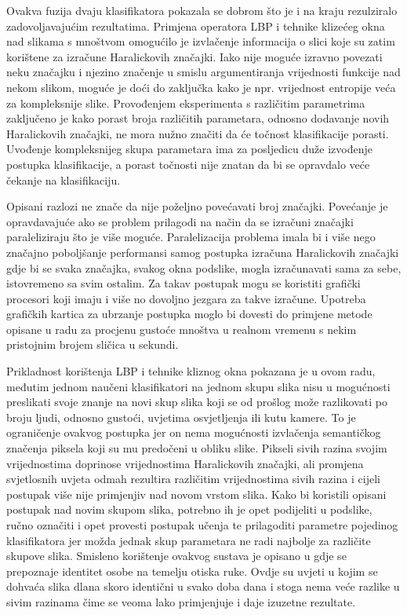 \documentclass[times, utf8, zavrsni, numeric]{fer}
\begin{document}
\bigbreak

Ovakva fuzija dvaju klasifikatora pokazala se dobrom što je i na kraju rezulziralo zadovoljavajućim
rezultatima. Primjena operatora LBP i tehnike klizećeg okna nad slikama s mnoštvom omogućilo je 
izvlačenje informacija o slici koje su zatim korištene za izračune Haralickovih značajki. Iako nije moguće 
izravno povezati neku značajku i njezino značenje u smislu argumentiranja vrijednosti funkcije
nad nekom slikom, moguće je doći do zaključka kako je npr. vrijednost entropije veća za kompleksnije slike.
Provođenjem eksperimenta s različitim parametrima zaključeno je kako porast broja različitih 
parametara, odnosno dodavanje novih Haralickovih značajki, ne mora nužno značiti da će točnost
klasifikacije porasti. Uvođenje kompleksnijeg skupa parametara ima za posljedicu duže izvođenje
postupka klasifikacije, a porast točnosti nije znatan da bi se opravdalo veće čekanje na klasifikaciju.

\bigbreak 

Opisani razlozi ne znače da nije poželjno povećavati broj značajki. Povećanje je opravdavajuće
ako se problem prilagodi na način da se izračuni značajki paraleliziraju što je više moguće. 
Paralelizacija problema imala bi i više nego značajno poboljšanje performansi samog postupka
izračuna Haralickovih značajki gdje bi se svaka značajka, svakog okna podslike, mogla izračunavati sama 
za sebe, istovremeno sa svim ostalim. Za takav postupak mogu se koristiti grafički procesori
koji imaju i više no dovoljno jezgara za takve izračune. Upotreba grafičkih kartica za ubrzanje
postupka moglo bi dovesti do primjene metode opisane u radu za procjenu gustoće mnoštva 
u realnom vremenu s nekim pristojnim brojem sličica u sekundi.

\bigbreak

Prikladnost korištenja LBP i tehnike kliznog okna pokazana je u ovom radu, međutim jednom
naučeni klasifikatori na jednom skupu slika nisu u mogućnosti preslikati svoje znanje
na novi skup slika koji se od prošlog može razlikovati po broju ljudi, odnosno gustoći,
uvjetima osvjetljenja ili kutu kamere. To je ograničenje ovakvog postupka jer on 
nema mogućnosti izvlačenja semantičkog značenja piksela koji su mu predočeni 
u obliku slike. Pikseli sivih razina  svojim vrijednostima doprinose vrijednostima Haralickovih 
značajki, ali promjena svjetlosnih uvjeta odmah rezultira različitim vrijednostima sivih
razina i cijeli postupak više nije primjenjiv nad novom vrstom slika. Kako bi koristili 
opisani postupak nad novim skupom slika, potrebno ih je opet podijeliti u podslike, 
ručno označiti i opet provesti postupak učenja te prilagoditi parametre pojedinog klasifikatora
jer možda jednak skup parametara ne radi najbolje za različite skupove slika. 
Smisleno korištenje ovakvog sustava je opisano u \citep{1512051} gdje
se prepoznaje identitet osobe na temelju otiska ruke. Ovdje su uvjeti u kojim se 
dohvaća slika dlana skoro identični u svako doba dana i stoga nema veće razlike
u sivim razinama čime se veoma lako primjenjuje i daje izuzetne rezultate.
\end{document}
